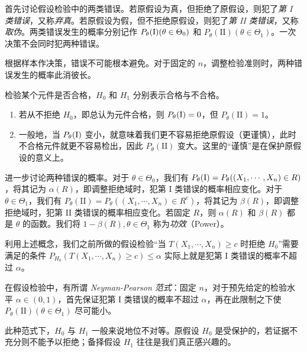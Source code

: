 \documentclass[../main.tex]{subfiles}
\begin{document}
首先讨论假设检验中的两类错误。若原假设为真，但拒绝了原假设，则犯了\emph{第 I 类错误}，又称\emph{弃真}。若原假设为假，但不拒绝原假设，则犯了\emph{第 II 类错误}，又称\emph{取伪}。两类错误发生的概率分别记作 $P_\theta(\text I)(\theta\in\Theta_0)$ 和 $P_\theta(\text{II})(\theta\in\Theta_1)$。一次决策不会同时犯两种错误。

根据样本作决策，错误不可能根本避免。对于固定的 $n$，调整检验准则时，两种错误发生的概率此消彼长。

\begin{example}
    检验某个元件是否合格，$H_0$ 和 $H_1$ 分别表示合格与不合格。
    \begin{enumerate}
        \item 若从不拒绝 $H_0$，即总认为元件合格，则 $P_\theta(\text I)=0$，但 $P_\theta(\text{II})=1$。
        \item 一般地，当 $P_\theta(\text I)$ 变小，就意味着我们更不容易拒绝原假设（更谨慎），此时不合格元件就更不容易检出，因此 $P_\theta(\text{II})$ 变大。这里的“谨慎”是在保护原假设的意义上。
    \end{enumerate}
\end{example}

进一步讨论两种错误的概率。对于 $\theta\in\Theta_0$，我们有 $P_\theta(\text I)=P_\theta((X_1,\cdots,X_n)\in R)$，将其记为 $\alpha(R)$，即调整拒绝域时，犯第 I 类错误的概率相应变化。对于 $\theta\in\Theta_1$，我们有 $P_\theta(\text{II})=P_\theta((X_1,\cdots,X_n)\in R^c)$，将其记为 $\beta(R)$，即调整拒绝域时，犯第 II 类错误的概率相应变化。若固定 $R$，则 $\alpha(R)$ 和 $\beta(R)$ 都是 $\theta$ 的函数。我们将 $1-\beta(R),\theta\in\Theta_1$ 称为\emph{功效}（Power）。

利用上述概念，我们之前所做的假设检验“当 $T(X_1,\cdots,X_n)\geq c$ 时拒绝 $H_0$”需要满足的条件 $P_{H_0}(T(X_1,\cdots,X_n)\geq c)\leq\alpha$ 实际上就是犯第 I 类错误的概率不超过 $\alpha$。

在假设检验中，有所谓 \emph{Neyman-Pearson 范式}：固定 $n$，对于预先给定的检验水平 $\alpha\in(0,1)$，首先保证犯第 I 类错误的概率不超过 $\alpha$，再在此限制之下使 $P_\theta(\text{II})(\theta\in\Theta_1)$ 尽可能小。

此种范式下，$H_0$ 与 $H_1$ 一般来说地位不对等。原假设 $H_0$ 是受保护的，若证据不充分则不能予以拒绝；备择假设 $H_1$ 往往是我们真正感兴趣的。
\end{document}
